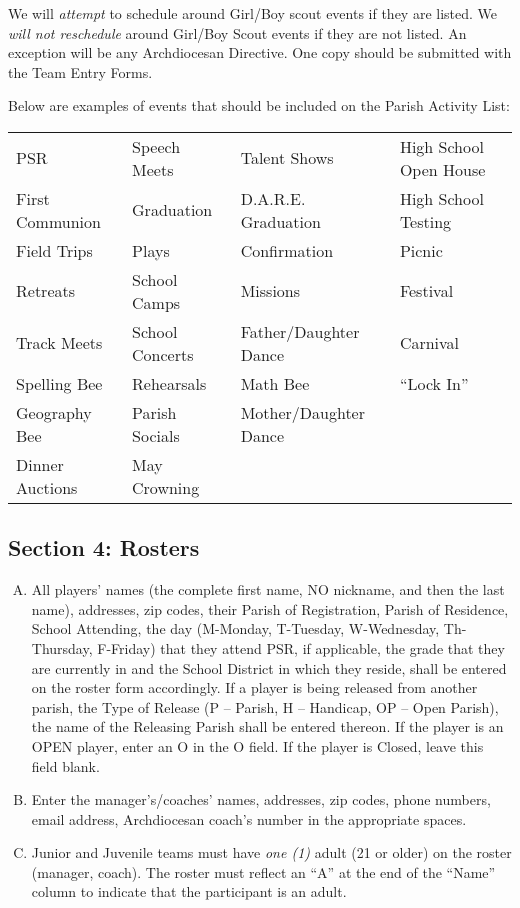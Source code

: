 We will {\em attempt} to schedule around Girl/Boy scout events if they are listed.  We {\em will not reschedule} around Girl/Boy Scout events if they are not listed.  An exception will be any Archdiocesan Directive. One copy should be submitted with the Team Entry Forms.

Below are examples of events that should be included on the Parish Activity List:

\begin{center}
    \begin{tabular}{>{\small}l >{\small}l >{\small}l >{\small}l}
        PSR & Speech Meets & Talent Shows & High School Open House \\
        First Communion & Graduation & D.A.R.E. Graduation & High School Testing \\
        Field Trips	& Plays & Confirmation & Picnic \\
        Retreats & School Camps & Missions & Festival \\
        Track Meets	& School Concerts & Father/Daughter Dance & Carnival \\
        Spelling Bee & Rehearsals & Math Bee & ``Lock In'' \\
        Geography Bee & Parish Socials & Mother/Daughter Dance	\\
        Dinner	Auctions & May Crowning & & \\
    \end{tabular}
\end{center}

\subsection{Section 4: Rosters}
\label{ssec:bylaw2-4}
\begin{enumerate}[A.]
    \item All players’ names (the complete first name, NO nickname, and then the last name), addresses, zip codes, their Parish of Registration, Parish of Residence, School Attending, the day (M-Monday, T-Tuesday, W-Wednesday, Th-Thursday, F-Friday) that they attend PSR, if applicable, the grade that they are currently in and the School District in which they reside, shall be entered on the roster form accordingly. If a player is being released from another parish, the Type of Release (P – Parish, H – Handicap, OP – Open Parish), the name of the Releasing Parish shall be entered thereon.  If the player is an OPEN player, enter an O in the O field.  If the player is Closed, leave this field blank.
    \item Enter the manager’s/coaches’ names, addresses, zip codes, phone numbers, email address, Archdiocesan coach’s number in the appropriate spaces.
    \item Junior and Juvenile teams must have {\em one (1)} adult (21 or older) on the roster (manager, coach).  The roster must reflect an ``A'' at the end of the ``Name'' column to indicate that the participant is an adult.
\end{enumerate}

